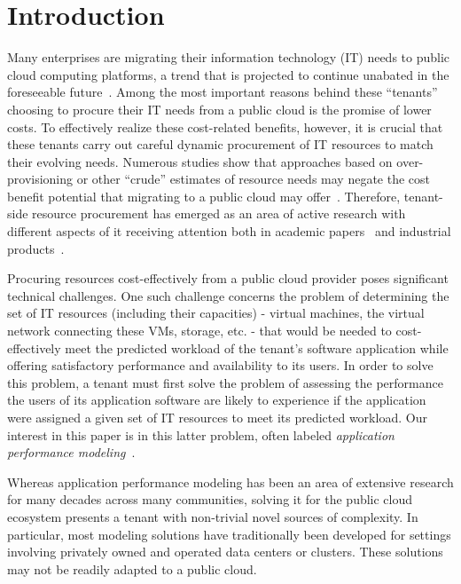 \section{Introduction}
\vspace{10pt}



Many enterprises are migrating their information technology (IT) needs to public cloud computing platforms, a trend that is projected to continue unabated in the foreseeable future~\cite{forbes}. Among the most important reasons behind these ``tenants'' choosing to procure their IT needs from a public cloud is the promise of lower costs. To effectively realize these cost-related benefits, however, it is crucial that these tenants carry out careful dynamic procurement of IT resources to match their evolving needs. Numerous studies show that approaches based on over-provisioning or other ``crude'' estimates of resource needs may negate the cost benefit potential that migrating to a public cloud may offer~\cite{takmig,xxx}. Therefore, tenant-side resource procurement has emerged as an area of active research with different aspects of it receiving attention both in academic papers~\cite{xxx} and industrial products~\cite{xxx}. 

Procuring resources cost-effectively from a public cloud provider poses significant technical challenges. One such challenge concerns the problem of determining the set of IT resources (including their capacities) - virtual machines, the virtual network connecting these VMs, storage, etc. - that would be needed to cost-effectively meet the predicted workload of the tenant's software application while offering satisfactory performance and availability to its users. In order to solve this problem, a tenant must first solve the problem of assessing the performance the users of its application software are likely to experience if the application were assigned a given set of IT resources to meet its predicted workload. Our interest in this paper is in this latter problem, often labeled {\it application performance modeling}~\cite{sigmetrics05,chrisstewart-eurosys,anshul,bianca,gosiaasser,lucy-cherkasova}. 


Whereas application performance modeling has been an area of extensive research for many decades across many communities, solving it for the public cloud ecosystem presents a tenant with non-trivial novel sources of complexity. In particular, most modeling solutions have traditionally been developed for settings involving privately owned and operated data centers or clusters. These solutions may not be readily adapted to a public cloud. %


